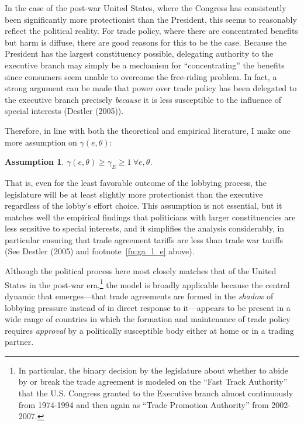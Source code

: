 \documentclass[10pt]{article}
\newtheorem{assumption}{Assumption}
\newcommand{\ta}{\theta}
\newcommand{\ga}{\gamma}
\begin{document}
In the case of the post-war United States, where the Congress has consistently been significantly more protectionist than the President, this seems to reasonably reflect the political reality. For trade policy, where there are concentrated benefits but harm is diffuse, there are good reasons for this to be the case. Because the President has the largest constituency possible, delegating authority to the executive branch may simply be a mechanism for ``concentrating'' the benefits since consumers seem unable to overcome the free-riding problem. In fact, a strong argument can be made that power over trade policy has been delegated to the executive branch precisely \textit{because} it is less susceptible to the influence of special interests (Destler (2005)).

Therefore, in line with both the theoretical and empirical literature, I make one more assumption on $\ga(e,\ta)$:

\begin{assumption}
  $\ga(e,\ta) \geq \ga_E \geq 1 \ \forall e,\ta$.
  \label{as:ga_l_e}
\end{assumption}

That is, even for the least favorable outcome of the lobbying process, the legislature will be at least slightly more protectionist than the executive regardless of the lobby's effort choice. This assumption is not essential, but it matches well the empirical findings that politicians with larger constituencies are less sensitive to special interests, and it simplifies the analysis considerably, in particular ensuring that trade agreement tariffs are less than trade war tariffs (See Destler (2005) and footnote~\ref{fn:ga_l_e} above).

Although the political process here most closely matches that of the United States in the post-war era,\footnote{In particular, the binary decision by the legislature about whether to abide by or break the trade agreement is modeled on the ``Fast Track Authority'' that the U.S. Congress granted to the Executive branch almost continuously from 1974-1994 and then again as ``Trade Promotion Authority'' from 2002-2007.} the model is broadly applicable because the central dynamic that emerges---that trade agreements are formed in the \textit{shadow} of lobbying pressure instead of in direct response to it---appears to be present in a wide range of countries in which the formation and maintenance of trade policy requires \textit{approval} by a politically susceptible body either at home or in a trading partner.
\end{document}

